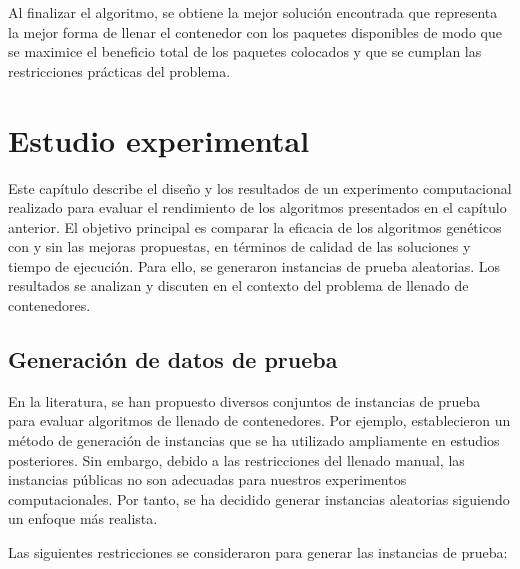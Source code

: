 \documentclass[openany]{article}
\begin{document}
Al finalizar el algoritmo, se obtiene la mejor solución encontrada que representa la mejor forma de llenar el contenedor con los paquetes disponibles de modo que se maximice el beneficio total de los paquetes colocados y que se cumplan las restricciones prácticas del problema.








\newpage








\section{Estudio experimental}

Este capítulo describe el diseño y los resultados de un experimento computacional realizado para evaluar el rendimiento de los algoritmos presentados en el capítulo anterior. El objetivo principal es comparar la eficacia de los algoritmos genéticos con y sin las mejoras propuestas, en términos de calidad de las soluciones y tiempo de ejecución. Para ello, se generaron instancias de prueba aleatorias. Los resultados se analizan y discuten en el contexto del problema de llenado de contenedores.

\subsection{Generación de datos de prueba}

En la literatura, se han propuesto diversos conjuntos de instancias de prueba para evaluar algoritmos de llenado de contenedores. Por ejemplo, \textcite{BISCHOFF1995377} establecieron un método de generación de instancias que se ha utilizado ampliamente en estudios posteriores. Sin embargo, debido a las restricciones del llenado manual, las instancias públicas no son adecuadas para nuestros experimentos computacionales. Por tanto, se ha decidido generar instancias aleatorias siguiendo un enfoque más realista.

Las siguientes restricciones se consideraron para generar las instancias de prueba:
\end{document}
